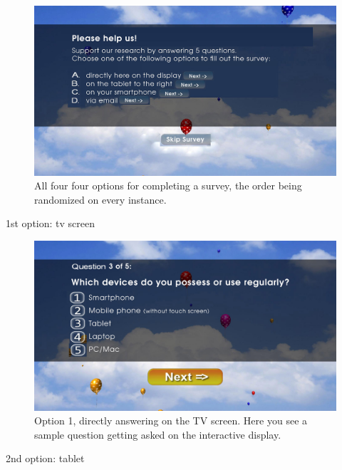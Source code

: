     \begin{figure}
        \begin{center}
            \includegraphics[width=\columnwidth]{img/screenshots/options-overview.jpg}
        \end{center}
     \caption{All four four options for completing a survey, the order being randomized on every instance.}
     \label{screenshot:options}
    \end{figure}


    1st option: tv screen

    \begin{figure}
        \begin{center}
            \includegraphics[width=\columnwidth]{img/screenshots/option-tv.jpg}
        \end{center}
     \caption{Option 1, directly answering on the TV screen. Here you see a sample question getting asked on the interactive display.}
     \label{screenshot:tv-option}
    \end{figure}


    2nd option: tablet

